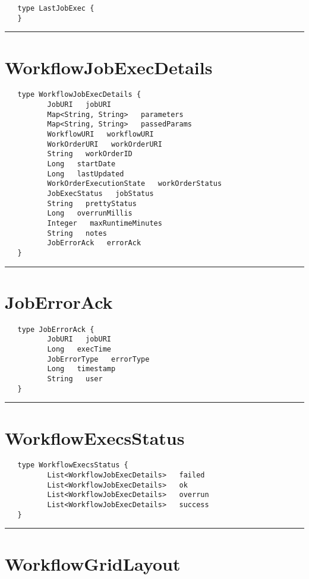 \begin{verbatim}
   type LastJobExec {
   }
\end{verbatim}

\rule{15cm}{2pt}
\section{WorkflowJobExecDetails}
\label{type:WorkflowJobExecDetails}

\begin{verbatim}
   type WorkflowJobExecDetails {
          JobURI   jobURI
          Map<String, String>   parameters
          Map<String, String>   passedParams
          WorkflowURI   workflowURI
          WorkOrderURI   workOrderURI
          String   workOrderID
          Long   startDate
          Long   lastUpdated
          WorkOrderExecutionState   workOrderStatus
          JobExecStatus   jobStatus
          String   prettyStatus
          Long   overrunMillis
          Integer   maxRuntimeMinutes
          String   notes
          JobErrorAck   errorAck
   }
\end{verbatim}

\rule{15cm}{2pt}
\section{JobErrorAck}
\label{type:JobErrorAck}

\begin{verbatim}
   type JobErrorAck {
          JobURI   jobURI
          Long   execTime
          JobErrorType   errorType
          Long   timestamp
          String   user
   }
\end{verbatim}

\rule{15cm}{2pt}
\section{WorkflowExecsStatus}
\label{type:WorkflowExecsStatus}

\begin{verbatim}
   type WorkflowExecsStatus {
          List<WorkflowJobExecDetails>   failed
          List<WorkflowJobExecDetails>   ok
          List<WorkflowJobExecDetails>   overrun
          List<WorkflowJobExecDetails>   success
   }
\end{verbatim}

\rule{15cm}{2pt}
\section{WorkflowGridLayout}
\label{type:WorkflowGridLayout}

